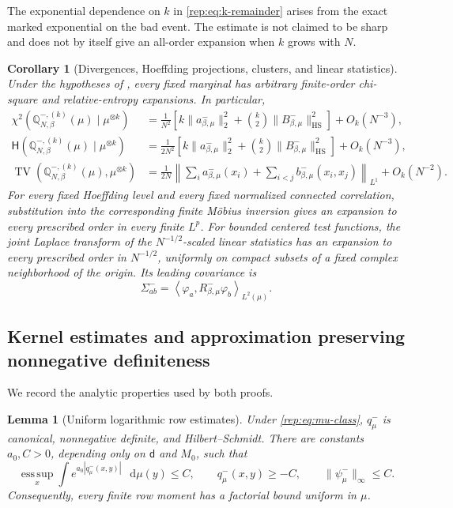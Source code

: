 \documentclass[11pt,reqno]{amsart}
\numberwithin{equation}{section}
\theoremstyle{plain}
\newtheorem{lemma}[lemma]{Lemma}
\newtheorem{cor}[cor]{Corollary}
\theoremstyle{definition}
\renewcommand{\d}{\mathsf d}
\newcommand{\dd}{\mathop{}\!\mathrm d}
\newcommand{\Q}{\mathbb Q}
\newcommand{\TV}{\operatorname{TV}}
\newcommand{\HS}{\mathrm{HS}}
\newcommand{\be}{\beta}
\newcommand{\Hr}{\mathsf H}
\begin{document}
The exponential dependence on $k$ in \eqref{rep:eq:k-remainder} arises from the exact marked exponential on the bad event. The estimate is not claimed to be sharp and does not by itself give an all-order expansion when $k$ grows with $N$.

\begin{cor}[Divergences, Hoeffding projections, clusters, and linear statistics]\label{rep:cor:consequences}
Under the hypotheses of , every fixed marginal has arbitrary finite-order chi-square and relative-entropy expansions. In particular,
\begin{align}
 \chi^2\!\left(\Q_{N,\be}^{-,(k)}(\mu)\mid\mu^{\otimes k}\right)
 &=\frac1{N^2}\left[k\|a^-_{\be,\mu}\|_2^2
 +\binom{k}{2}\|B^-_{\be,\mu}\|_{\HS}^2\right]+O_k(N^{-3}),\label{rep:eq:chi-leading}\\
 \Hr\!\left(\Q_{N,\be}^{-,(k)}(\mu)\mid\mu^{\otimes k}\right)
 &=\frac1{2N^2}\left[k\|a^-_{\be,\mu}\|_2^2
 +\binom{k}{2}\|B^-_{\be,\mu}\|_{\HS}^2\right]+O_k(N^{-3}),\label{rep:eq:kl-leading}\\
 \TV\!\left(\Q_{N,\be}^{-,(k)}(\mu),\mu^{\otimes k}\right)
 &=\frac1{2N}\left\|\sum_i a^-_{\be,\mu}(x_i)
 +\sum_{i<j}b^-_{\be,\mu}(x_i,x_j)\right\|_{L^1}
 +O_k(N^{-2}).\label{rep:eq:tv-leading}
\end{align}
For every fixed Hoeffding level and every fixed normalized connected correlation, substitution into the corresponding finite M\"obius inversion gives an expansion to every prescribed order in every finite $L^p$. For bounded centered test functions, the joint Laplace transform of the $N^{-1/2}$-scaled linear statistics has an expansion to every prescribed order in $N^{-1/2}$, uniformly on compact subsets of a fixed complex neighborhood of the origin. Its leading covariance is
\begin{equation}\label{rep:eq:linear-covariance}
 \Sigma^-_{ab}=\left\langle\varphi_a,
 R^-_{\be,\mu}\varphi_b\right\rangle_{L^2(\mu)}.
\end{equation}
\end{cor}

\subsection{Kernel estimates and approximation preserving nonnegative definiteness}

We record the analytic properties used by both proofs.

\begin{lemma}[Uniform logarithmic row estimates]\label{rep:lem:rows}
Under \eqref{rep:eq:mu-class}, $q^-_\mu$ is canonical, nonnegative definite, and Hilbert--Schmidt. There are constants $a_0,C>0$, depending only on $\d$ and $M_0$, such that
\begin{equation}\label{rep:eq:row-exp}
 \operatorname*{ess\,sup}_x\int e^{a_0|q^-_\mu(x,y)|}\,\dd\mu(y)\le C,
 \qquad q^-_\mu(x,y)\ge-C,
 \qquad \|\psi^-_\mu\|_\infty\le C.
\end{equation}
Consequently, every finite row moment has a factorial bound uniform in $\mu$.
\end{lemma}
\end{document}
